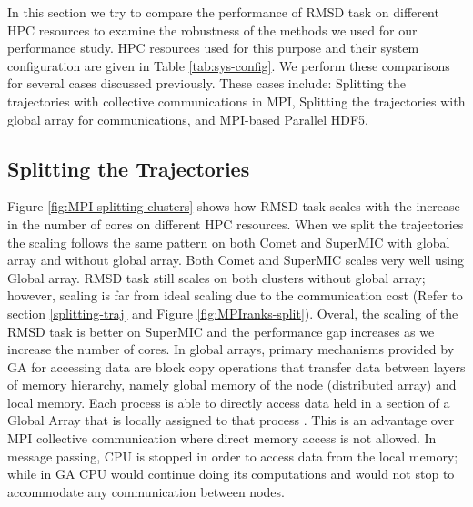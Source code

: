 \label{sec:clusters}
In this section we try to compare the performance of RMSD task on different HPC resources to examine the robustness of the methods we used for our performance study.
HPC resources used for this purpose and their system configuration are given in Table \ref{tab:sys-config}.
We perform these comparisons for several cases discussed previously. 
These cases include: Splitting the trajectories with collective communications in MPI, Splitting the trajectories with global array for communications, and MPI-based Parallel HDF5.

\subsection{Splitting the Trajectories}
Figure \ref{fig:MPI-splitting-clusters} shows how RMSD task scales with the increase in the number of cores on different HPC resources.  
When we split the trajectories the scaling follows the same pattern on both Comet and SuperMIC with global array and without global array.
Both Comet and SuperMIC scales very well using Global array. 
RMSD task still scales on both clusters without global array; however, scaling is far from ideal scaling due to the communication cost (Refer to section \ref{splitting-traj} and Figure \ref{fig:MPIranks-split}). 
Overal, the scaling of the RMSD task is better on SuperMIC and the performance gap increases as we increase the number of cores.
In global arrays, primary mechanisms provided by GA for accessing data are block copy operations that transfer data between layers of memory hierarchy, namely global memory of the node (distributed array) and local memory. 
Each process is able to directly access data held in a section of a Global Array that is locally assigned to that process \cite{GA}.
This is an advantage over MPI collective communication where direct memory access is not allowed. 
In message passing, CPU is stopped in order to access data from the local memory; while in GA CPU would continue doing its computations and would not stop to accommodate any communication between
nodes.

